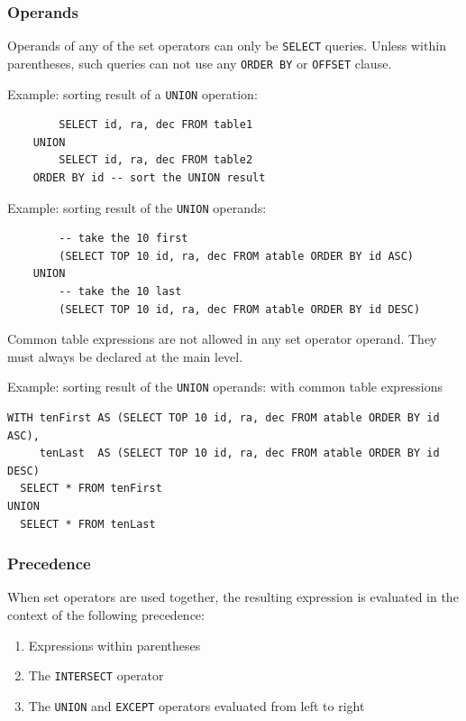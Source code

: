 \documentclass[11pt,a4paper]{ivoa}
\begin{document}
\subsubsection{Operands}

Operands of any of the set operators can only be \verb:SELECT: queries.
Unless within parentheses, such queries can not use any \verb:ORDER BY: or
\verb:OFFSET: clause.

Example: sorting result of a \verb:UNION: operation:

\begin{verbatim}
        SELECT id, ra, dec FROM table1
    UNION
        SELECT id, ra, dec FROM table2
    ORDER BY id -- sort the UNION result
\end{verbatim}

Example: sorting result of the \verb:UNION: operands:

\begin{verbatim}
        -- take the 10 first
        (SELECT TOP 10 id, ra, dec FROM atable ORDER BY id ASC)
    UNION
        -- take the 10 last
        (SELECT TOP 10 id, ra, dec FROM atable ORDER BY id DESC)
\end{verbatim}

Common table expressions are not allowed in any set operator operand. They must
always be declared at the main level.

Example: sorting result of the \verb:UNION: operands: with common table
expressions

\begin{verbatim}
WITH tenFirst AS (SELECT TOP 10 id, ra, dec FROM atable ORDER BY id ASC),
     tenLast  AS (SELECT TOP 10 id, ra, dec FROM atable ORDER BY id DESC)
  SELECT * FROM tenFirst
UNION
  SELECT * FROM tenLast
\end{verbatim}

\subsubsection{Precedence}

When set operators are used together, the resulting expression is
evaluated in the context of the following precedence:

\begin{enumerate}
    \item Expressions within parentheses
    \item The \verb:INTERSECT: operator
    \item The \verb:UNION: and \verb:EXCEPT: operators evaluated from left to right
\end{enumerate}
\end{document}
